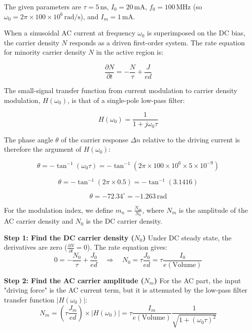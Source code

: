 The given parameters are $\tau = 5\,\text{ns}$, $I_0 = 20\,\text{mA}$, $f_0 = 100\,\text{MHz}$ (so $\omega_0 = 2\pi \times 100\times10^6\,\text{rad/s}$), and $I_m = 1\,\text{mA}$.

When a sinusoidal AC current at frequency $\omega_0$ is superimposed on the DC bias, the carrier density $N$ responds as a driven first-order system. The rate equation for minority carrier density $N$ in the active region is:

\begin{equation*}
  \frac{\partial N}{\partial t} = -\frac{N}{\tau} + \frac{J}{ed}
\end{equation*}

The small-signal transfer function from current modulation to carrier density modulation, $H(\omega_0)$, is that of a single-pole low-pass filter:

\begin{equation*}
  H(\omega_0) = \frac{1}{1 + j\omega_0\tau}
\end{equation*}

The phase angle $\theta$ of the carrier response $\Delta n$ relative to the driving current is therefore the argument of $H(\omega_0)$:

\begin{equation*}
  \theta = -\tan^{-1}(\omega_0\tau) = -\tan^{-1}(2\pi \times 100\times10^6 \times 5\times10^{-9})
\end{equation*}

\begin{equation*}
  \theta = -\tan^{-1}(2\pi \times 0.5) = -\tan^{-1}(3.1416)
\end{equation*}

\begin{equation*}
  \boxed{\theta = -72.34^\circ = -1.263\,\text{rad}}
\end{equation*}

For the modulation index, we define $m_n = \frac{N_m}{N_0}$, where $N_m$ is the amplitude of the AC carrier density and $N_0$ is the DC carrier density.

\textbf{Step 1: Find the DC carrier density ($N_0$)}
Under DC steady state, the derivatives are zero ($\frac{\partial N}{\partial t} = 0$). The rate equation gives:
\begin{equation*}
  0 = -\frac{N_0}{\tau} + \frac{J_0}{ed} \quad\Longrightarrow\quad N_0 = \tau \frac{J_0}{ed} = \tau \frac{I_0}{e(\text{Volume})}
\end{equation*}

\textbf{Step 2: Find the AC carrier amplitude ($N_m$)}
For the AC part, the input "driving force" is the AC current term, but it is attenuated by the low-pass filter transfer function $|H(\omega_0)|$:
\begin{equation*}
  N_m = \left( \tau \frac{J_m}{ed} \right) \times |H(\omega_0)| = \tau \frac{I_m}{e(\text{Volume})} \frac{1}{\sqrt{1+(\omega_0\tau)^2}}
\end{equation*}

